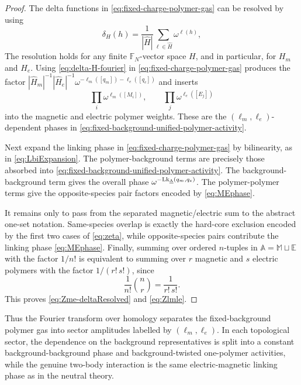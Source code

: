 \begin{proof}
	The delta functions in \eqref{eq:fixed-charge-polymer-gas} can be resolved by using
	\begin{equation}
		\delta_H(h) = \frac{1}{|\widehat H|} \sum_{\ell \in \widehat H} \omega^{\ell(h)}, \label{eq:delta-H-fourier}
	\end{equation}
	The resolution holds for any finite $\mathbb F_N$-vector space $H$, and in particular, for $H_m$ and $H_e$. Using \eqref{eq:delta-H-fourier} in
	\eqref{eq:fixed-charge-polymer-gas} produces the factor $|\widehat H_m|^{-1}|\widehat H_e|^{-1}
	\omega^{-\ell_m([q_m])-\ell_e([q_e])}$
	and inserts
	\[
	\prod_i\omega^{\ell_m([M_i])},
	\qquad
	\prod_j\omega^{\ell_e([E_j])}
	\]
	into the magnetic and electric polymer weights. These are the $(\ell_m,\ell_e)$-dependent phases in \eqref{eq:fixed-background-unified-polymer-activity}.
	
	Next expand the linking phase in \eqref{eq:fixed-charge-polymer-gas} by bilinearity, as in \eqref{eq:LbiExpansion}. The polymer-background terms are precisely those absorbed into \eqref{eq:fixed-background-unified-polymer-activity}. The background-background term gives
	the overall phase
	\(\omega^{-\mathrm{Lk}_{\underline\Lambda}(q_m,q_e)}\). The polymer-polymer terms
	give the opposite-species pair factors encoded by \eqref{eq:MEphase}.
	
	It remains only to pass from the separated magnetic/electric sum to the abstract
	one-set notation. Same-species overlap is exactly the hard-core exclusion encoded by the
	first two cases of \eqref{eq:zeta}, while opposite-species pairs contribute the linking phase
	\eqref{eq:MEphase}. Finally, summing over ordered \(n\)-tuples in
	\(\mathbb A=\mathbb M \sqcup \mathbb E\) with the factor
	\(1/n!\) is equivalent to summing over \(r\) magnetic and \(s\) electric polymers with
	the factor \(1/(r!\,s!)\), since
	\[
	\frac{1}{n!}\binom{n}{r}
	=
	\frac{1}{r!\,s!}.
	\]
	This proves \eqref{eq:Zme-deltaResolved} and \eqref{eq:Zlmle}.
\end{proof}

Thus the Fourier transform over homology separates the fixed-background polymer gas into
sector amplitudes labelled by \((\ell_m,\ell_e)\). In each topological sector, the dependence on the
background representatives is split into a constant background-background phase and
background-twisted one-polymer activities, while the genuine two-body interaction is the
same electric-magnetic linking phase as in the neutral theory.






